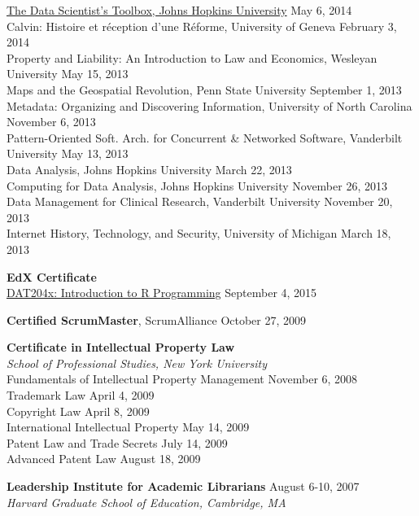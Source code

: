 \documentclass[10pt]{res} %
\begin{document}
\begin{resume}
\href{https://www.coursera.org/account/accomplishments/certificate/TDXTJWK9DR}{The Data Scientist’s Toolbox, Johns Hopkins University} \hfill  May 6, 2014 \\ 
Calvin: Histoire et réception d'une Réforme, University of Geneva \hfill  February 3, 2014 \\
Property and Liability: An Introduction to Law and Economics, Wesleyan University \hfill  May 15, 2013 \\
Maps and the Geospatial Revolution, Penn State University \hfill  September 1, 2013 \\
Metadata: Organizing and Discovering Information, University of North Carolina \hfill  November 6, 2013 \\
Pattern-Oriented Soft. Arch. for Concurrent \& Networked Software, Vanderbilt University \hfill  May 13, 2013 \\
Data Analysis, Johns Hopkins University \hfill  March 22, 2013 \\
Computing for Data Analysis, Johns Hopkins University \hfill  November 26, 2013 \\
Data Management for Clinical Research, Vanderbilt University \hfill  November 20, 2013 \\
Internet History, Technology, and Security, University of Michigan \hfill  March 18, 2013

{\bf EdX Certificate} \\
\href{https://s3.amazonaws.com/verify.edx.org/downloads/98d8d11c3f9b4ab0a59b92d489d3018c/Certificate.pdf}{DAT204x: Introduction to R Programming} \hfill  September 4, 2015 

{\bf Certified ScrumMaster}, ScrumAlliance \hfill October 27, 2009

{\bf Certificate in Intellectual Property Law} \\
{\sl School of Professional Studies, New York University} \\
Fundamentals of Intellectual Property Management \hfill November 6, 2008 \\
Trademark Law \hfill April 4, 2009 \\
Copyright Law \hfill April 8, 2009 \\
International Intellectual Property \hfill May 14, 2009 \\
Patent Law and Trade Secrets \hfill July 14, 2009 \\
Advanced Patent Law \hfill August 18, 2009

{\bf Leadership Institute for Academic Librarians} \hfill August 6-10, 2007 \\
{\sl Harvard Graduate School of Education, Cambridge, MA } 


\end{resume}
\end{document}
